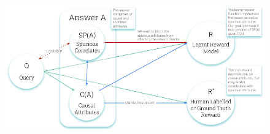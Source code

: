 \begin{figure}[!t]               %
  \centering
  \begin{minipage}[t]{0.58\textwidth}
    \vspace{0.0in}
    \centering
    \includegraphics[width=\linewidth]{images/CausalGraphA.pdf}
    

\end{minipage}
\end{figure}
